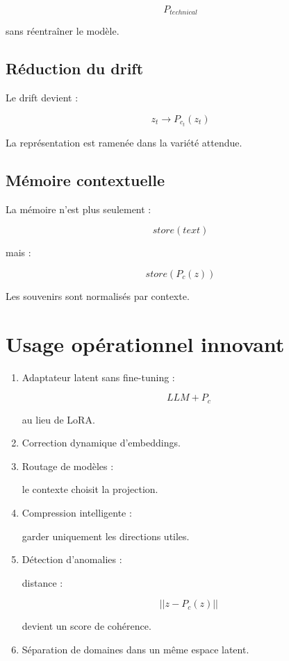 \documentclass{article}
\begin{document}
\[
P_{technical}
\]


sans réentraîner le modèle.


\subsection{Réduction du drift}

Le drift devient :

\[
z_t\rightarrow P_{c_t}(z_t)
\]


La représentation est ramenée dans la variété attendue.


\subsection{Mémoire contextuelle}

La mémoire n'est plus seulement :

\[
store(text)
\]


mais :

\[
store(P_c(z))
\]


Les souvenirs sont normalisés par contexte.


\section{Usage opérationnel innovant}

\begin{enumerate}

\item Adaptateur latent sans fine-tuning :

\[
LLM+P_c
\]

au lieu de LoRA.


\item Correction dynamique d'embeddings.


\item Routage de modèles :

le contexte choisit la projection.


\item Compression intelligente :

garder uniquement les directions utiles.


\item Détection d'anomalies :

distance :

\[
||z-P_c(z)||
\]

devient un score de cohérence.


\item Séparation de domaines dans un même espace latent.

\end{enumerate}
\end{document}
